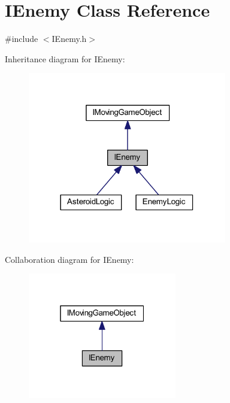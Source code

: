 \hypertarget{class_i_enemy}{}\section{I\+Enemy Class Reference}
\label{class_i_enemy}


{\ttfamily \#include $<$I\+Enemy.\+h$>$}



Inheritance diagram for I\+Enemy\+:\nopagebreak
\begin{figure}[H]
\begin{center}
\leavevmode
\includegraphics[width=246pt]{class_i_enemy__inherit__graph}
\end{center}
\end{figure}


Collaboration diagram for I\+Enemy\+:\nopagebreak
\begin{figure}[H]
\begin{center}
\leavevmode
\includegraphics[width=184pt]{class_i_enemy__coll__graph}
\end{center}
\end{figure}
